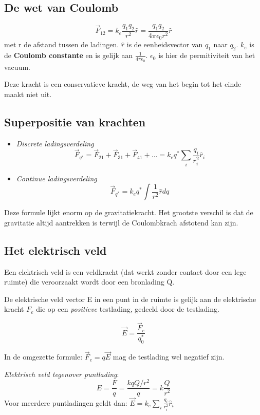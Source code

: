 \documentclass[12pt,a4paper]{article}
\begin{document}
	\subsection{De wet van Coulomb}
	\[\vec{F}_12 = k_e\frac{q_1 q_2}{r^2}\hat{r} = \frac{q_1q_2}{4\pi \epsilon_0 r^2}\hat{r}\]
	met r de afstand tussen de ladingen. \(\hat{r}\) is de eenheidsvector van $q_1$ naar $q_2$.
	$k_e$ is de \textbf{Coulomb constante} en is gelijk aan \(\frac{1}{4\pi\epsilon_0}\). $\epsilon_0$ is hier de permitiviteit van het vacuum.
	
	Deze kracht is een conservatieve kracht, de weg van het begin tot het einde maakt niet uit. 
	\newline
	
	\subsection{Superpositie van krachten}
	\begin{itemize}
		\item \textit{Discrete ladingsverdeling} 
		\[\vec{F}_{q^*} = \vec{F}_{21} + \vec{F}_{31} + \vec{F}_{41} + ... = k_eq^*\sum_i \frac{q_i}{r_i^2}\hat{r}_i\]
		\item \textit{Continue ladingsverdeling}
		\[\vec{F}_{q^*} = k_eq^* \int\frac{1}{r^2}\hat{r}dq\]
	\end{itemize}
    Deze formule lijkt enorm op de gravitatiekracht. Het grootste verschil is dat de gravitatie altijd aantrekken is terwijl de Coulombkrach afstotend kan zijn.
    
    \subsection{Het elektrisch veld}
    Een elektrisch veld is een veldkracht (dat werkt zonder contact door een lege ruimte) die veroorzaakt wordt door een bronlading Q.
    
    De elektrische veld vector E in een punt in de ruimte is gelijk aan de elektrische kracht $F_e$ die op een \textit{positieve} testlading, gedeeld door de testlading.
    
    \[\vec{E} = \frac{\vec{F}_e}{q_0^*}\]
    
    In de omgezette formule: \(\vec{F}_e = q\vec{E}\) mag de testlading wel negatief zijn. 
    
    \textit{Elektrisch veld tegenover puntlading}:
    \[E = \frac{F}{q} = \frac{kqQ/r^2}{q} = k\frac{Q}{r^2}\]
    Voor meerdere puntladingen geldt dan: \(\vec{E} = k_e \sum_i \frac{q_i}{r_i^2}\hat{r}_i\)
    
\end{document}
